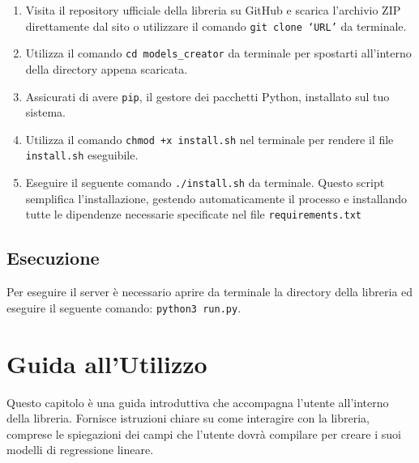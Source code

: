 \documentclass{rapportECL}
\newcommand{\rootDirectory}{models\_creator}
\begin{document}
\begin{enumerate}
  \item Visita il repository ufficiale della libreria su GitHub e scarica l'archivio ZIP direttamente dal sito o utilizzare il comando \texttt{git clone `URL'} da terminale.
  \item Utilizza il comando \texttt{cd \rootDirectory} da terminale per spostarti all'interno della directory appena scaricata.
  \item Assicurati di avere \texttt{pip}, il gestore dei pacchetti Python, installato sul tuo sistema.
  \item Utilizza il comando \texttt{chmod +x install.sh} nel terminale per rendere il file \texttt{install.sh} eseguibile.
  \item Eseguire il seguente comando \texttt{./install.sh} da terminale. Questo script semplifica l'installazione, gestendo automaticamente il processo 
  e installando tutte le dipendenze necessarie specificate nel file \texttt{requirements.txt}
\end{enumerate}

\section*{Esecuzione}
Per eseguire il server è necessario aprire da terminale la directory della libreria ed eseguire
il seguente comando: \texttt{python3 run.py}.



\chapter{Guida all'Utilizzo}
\label{cha:guida}

Questo capitolo è una guida introduttiva che accompagna l'utente all'interno della libreria. Fornisce istruzioni chiare su come interagire con la libreria, 
comprese le spiegazioni dei campi che l'utente dovrà compilare per creare i suoi modelli di regressione lineare.
\end{document}

